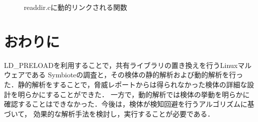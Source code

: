 \documentclass[submit,techreq,noauthor]{eco}	%
\begin{document}
\begin{figure}[H]
	\centering
	\caption{readdir.cに動的リンクされる関数}
	\label{fig:ltrace}
\end{figure}

\section{おわりに}
LD\_PRELOADを利用することで，共有ライブラリの置き換えを行うLinuxマルウェアである
Symbioteの調査と，その検体の静的解析および動的解析を行った．静的解析をすることで，脅威レポートからは得られなかった検体の詳細な設計を明らかにすることができた．
一方で，動的解析では検体の挙動を明らかに確認することはできなかった．今後は，検体が検知回避を行うアルゴリズムに基づいて，
効果的な解析手法を検討し，実行することが必要である．


\setlength\baselineskip{12pt}
{\small
	
	
}
\end{document}
